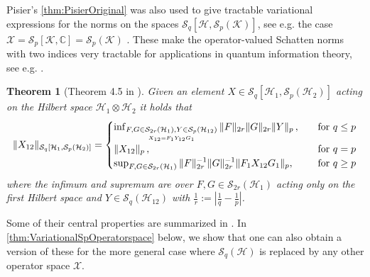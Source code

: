 \documentclass[11pt]{article}
\newcommand{\1}{\ensuremath{\mathbbm{1}}}
\theoremstyle{newdefinition}
\theoremstyle{newplain}
\newtheorem{theorem}[definition]{Theorem}
\theoremstyle{myplain}
\begin{document}
Pisier's \cref{thm:PisierOriginal} was also used to give tractable variational expressions for the norms on the spaces $\mathcal{S}_q[\mathcal{H},\mathcal{S}_p(\mathcal{K})]$, see e.g. the case $\mathcal{X}=\mathcal{S}_p[\mathcal{K},\mathbb{C}]=\mathcal{S}_p(\mathcal{K})$ \cite[Section 3.5]{Devetak.2006}.
These make the operator-valued Schatten norms with two indices very tractable for applications in quantum information theory, see e.g. \cite{Beigi.2016,Bardet.2022,Beigi.2023, Cheng.2024, Devetak.2006, Gao.2023, Gupta.2015, Wilde.2014}. 
\begin{theorem}[Theorem 4.5 in \cite{Book.Pisier.1998}]\label{thm:2.pisier.variational.expressions}
\label{thm:expression-pq}
Given an element $X\in \mathcal{S}_q[\mathcal{H}_1,\mathcal{S}_p(\mathcal{H}_2)]$ acting on the Hilbert space $\mathcal{H}_1\otimes\mathcal{H}_2$ it holds that
\begin{align}
\|X_{12}\|_{\mathcal{S}_q[\mathcal{H}_1,\mathcal{S}_p(\mathcal{H}_2)]}
=
    \begin{cases}
        \inf_{\underset{X_{12}=F_1Y_{12}G_1}{F,G\in \mathcal{S}_{2r}(\mathcal{H}_1),Y\in \mathcal{S}_{p}(\mathcal{H}_{12})}} \|F\|_{2r}\|G\|_{2r}\|Y\|_{p}\,, & \quad \textup{for } q\leq p \\
        \|X_{12}\|_p\,, & \quad \textup{for } q=p \\
        \sup_{F,G\in\mathcal{S}_{2r}(\mathcal{H}_1)} \|F\|^{-1}_{2r}\|G\|^{-1}_{2r}\|F_1X_{12}G_1\|_p, & \quad \textup{for } q\geq p
    \end{cases}
\end{align}
where the infimum and supremum are over $F,G\in \mathcal{S}_{2r}(\mathcal{H}_1)$ acting only on the first Hilbert space and $Y\in \mathcal{S}_q(\mathcal{H}_{12})$ with $\frac{1}{r}:=\left|\frac{1}{q}-\frac{1}{p}\right|$.
\end{theorem}
Some of their central properties are summarized in \cite{Devetak.2006}.
In \cref{thm:VariationalSpOperatorspace} below, we show that one can also obtain a version of these for the more general case where $\mathcal{S}_q(\mathcal{H})$ is replaced by any other operator space $\mathcal{X}$.
\end{document}
